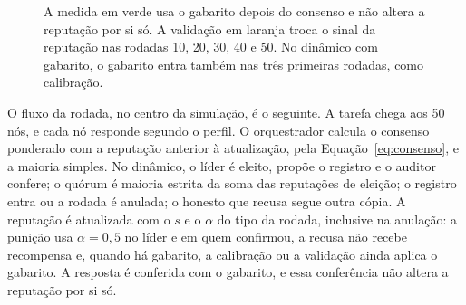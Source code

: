 \documentclass[12pt]{article}
\begin{document}
\begin{figure}[H]
\centering
{}
\caption{A medida em verde usa o gabarito depois do consenso e não altera a reputação por si só. A validação em laranja troca o sinal da reputação nas rodadas 10, 20, 30, 40 e 50. No dinâmico com gabarito, o gabarito entra também nas três primeiras rodadas, como calibração.}
\label{fig:arquitetura-gt}
\end{figure}

O fluxo da rodada, no centro da simulação, é o seguinte. A tarefa chega aos 50 nós, e cada nó responde segundo o perfil. O orquestrador calcula o consenso ponderado com a reputação anterior à atualização, pela Equação~\ref{eq:consenso}, e a maioria simples. No dinâmico, o líder é eleito, propõe o registro e o auditor confere; o quórum é maioria estrita da soma das reputações de eleição; o registro entra ou a rodada é anulada; o honesto que recusa segue outra cópia. A reputação é atualizada com o $s$ e o $\alpha$ do tipo da rodada, inclusive na anulação: a punição usa $\alpha = 0{,}5$ no líder e em quem confirmou, a recusa não recebe recompensa e, quando há gabarito, a calibração ou a validação ainda aplica o gabarito. A resposta é conferida com o gabarito, e essa conferência não altera a reputação por si só.
\end{document}
